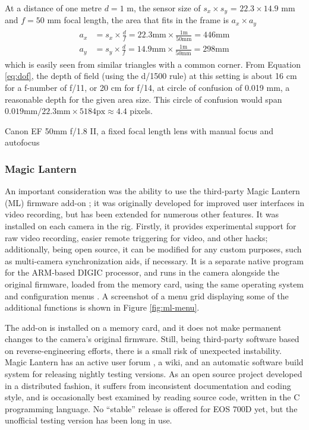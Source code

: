 At a distance of one metre $d = 1$ m, the sensor size of $s_x \times s_y$ = $22.3 \times 14.9$ mm and $f = 50$ mm focal length, the area that fits in the frame is $a_x \times a_y$
\begin{align} \label{eq:areasize} \begin{split}
	a_x &= s_x \times \frac{d}{f} = 22.3 \text{mm} \times \frac{1 \text{m}}{50 \text{mm}} = 446 \text{mm}\\
	a_y &= s_y \times \frac{d}{f} = 14.9 \text{mm} \times \frac{1 \text{m}}{50 \text{mm}} = 298 \text{mm}
\end{split} \end{align}
which is easily seen from similar triangles with a common corner.
From Equation \ref{eq:dof}, the depth of field (using the d/1500 rule) at this setting is about 16 cm for a f-number of f/11, or 20 cm for f/14, at circle of confusion of 0.019 mm, a reasonable depth for the given area size.
This circle of confusion would span $0.019 \text{mm} / 22.3 \text{mm} \times 5184 \text{px} \approx 4.4$ pixels.

{Canon EF 50mm f/1.8 II, a fixed focal length lens with manual focus and autofocus}

\subsubsection{Magic Lantern}

An important consideration was the ability to use the third-party Magic Lantern (ML) firmware add-on \cite{magiclantern};
it was originally developed for improved user interfaces in video recording, but has been extended for numerous other features.
It was installed on each camera in the rig.
Firstly, it provides experimental support for raw video recording, easier remote triggering for video, and other hacks;
additionally, being open source, it can be modified for any custom purposes, such as multi-camera synchronization aids, if necessary.
It is a separate native program for the ARM-based DIGIC processor, and runs in the camera alongside the original firmware, loaded from the memory card, using the same operating system and configuration menus \cite{magiclantern}.
A screenshot of a menu grid displaying some of the additional functions is shown in Figure \ref{fig:ml-menu}.

The add-on is installed on a memory card, and it does not make permanent changes to the camera's original firmware.
Still, being third-party software based on reverse-engineering efforts, there is a small risk of unexpected instability.
Magic Lantern has an active user forum \cite{magiclanternforum}, a wiki, and an automatic software build system for releasing nightly testing versions.
As an open source project developed in a distributed fashion, it suffers from inconsistent documentation and coding style, and is occasionally best examined by reading source code, written in the C programming language.
No ``stable'' release is offered for EOS 700D yet, but the unofficial testing version has been long in use.


